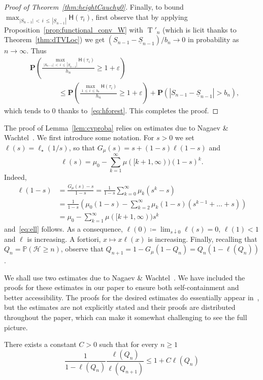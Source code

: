 \documentclass[AHL,Unicode,longabstracts,published]{cedram}
\renewcommand{\P}{\mathbb{P}}
\newcommand{\height}{\mathsf{H}}
\newcommand{\p}{\mathbf{P}}
\DeclareMathOperator{\rtree}{T}
\newcommand{\cH}{\mathcal{H}}
\begin{document}
\begin{proof}[Proof of Theorem~\ref{thm:heightCauchy0}]
Finally, to bound $\max_{|S_{n-1}|\,<\,i\,\leq\,|\underline{S}_{n-1}|}\height(\tau_{i})$, first observe that by applying Proposition~\ref{prop:functional_conv_W} with $\rtree'_{ n}$ (which is licit thanks to Theorem~\ref{thm:dTVLoc}) we get $(S_{n-1}-\underline{S}_{n-1})/b_{n} \rightarrow 0$ in probability as $n \rightarrow \infty$. Thus
\begin{align*}
&\p \left(\frac{\max_{|S_{n-1}|\,<\,i\,\leq\,|\underline{S}_{n-1}|}\height(\tau_{i})}{h_{n}} \geq 1+\varepsilon \right) \\
& \qquad \qquad \leq
\p \left(\frac{\max_{1\,\leq\,i\,\leq\,b_{n} }\height(\tau_{i})}{h_{n}} \geq 1+ \varepsilon \right) + \p \left(|S_{n-1}-\underline{S}_{n-1}| > b_{n} \right),
\end{align*}
which tends to $0$ thanks to~\eqref{eq:hforest}. This completes the proof.
\end{proof}


The proof of Lemma~\ref{lem:cvproba} relies on estimates due to Nagaev \& Wachtel~\cite{NW07}. We first introduce some notation. For $s>0$ we set $\ell(s)=\ell_{\star}(1/s)$, so that $G_{\mu}(s)=s+(1-s) \ell \left(1-s\right)$ and
\begin{equation}\label{eq:ell}
\ell(s)=\mu_0 -\sum_{k=1}^\infty \mu([k+1,\infty)) (1-s)^k.
\end{equation}
Indeed,
\begin{align*}
\ell(1-s)&= \frac{G_{\mu}(s)-s}{1-s} = \frac{1}{1-s}\sum_{k=0}^\infty \mu_k\left(s^k-s\right)\\
&= \frac{1}{1-s}\left(\mu_0(1-s)-\sum_{k=2}^\infty \mu_k(1-s)(s^{k-1}+\dots+s)\right)\\
&=\mu_0 -\sum_{k=1}^\infty \mu([k+1,\infty)) s^k
\end{align*}
and~\eqref{eq:ell} follows. As a consequence, $\ell(0)\coloneqq \lim_{s\downarrow0}\ell(s)=0$, $\ell(1)<1$ and $\ell$ is increasing. A fortiori, $x \mapsto x \ell(x)$ is increasing. Finally, recalling that $Q_n = \P(\cH \geq n)$, observe that $Q_{n+1}=1-G_\mu(1-Q_n)=Q_{n}(1-\ell(Q_{n}))$.

We shall use two estimates due to Nagaev \& Wachtel~\cite{NW07}. We have included the proofs for these estimates in our paper to ensure both self-containment and better accessibility. The proofs for the desired estimates do essentially appear in~\cite{NW07}, but the estimates are not explicitly stated and their proofs are distributed throughout the paper, which can make it somewhat challenging to see the full picture.

\begin{lemm}\label{lem:1}
There exists a constant $C>0$ such that for every $n \geq 1$
\[
\frac{1}{1-\ell(Q_{n})}\frac{\ell(Q_{n})}{\ell(Q_{n+1})} \leq 1+C \ell(Q_{n})
\]
\end{lemm}
\end{document}
